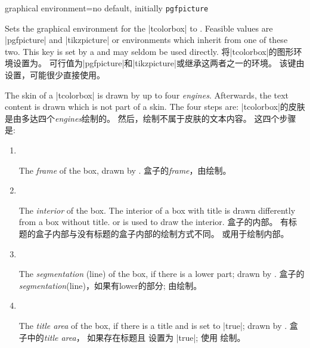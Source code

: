 \begin{docTcbKey}{graphical environment}{=}{no default, initially \texttt{pgfpicture}}
\begin{stripedbox}
Sets the graphical environment for the |tcolorbox| to .
Feasible values are |pgfpicture| and |tikzpicture| or environments which inherit from one of these two. 
This key is set by a  and may seldom be used directly.
\tcblower
将|tcolorbox|的图形环境设置为。%
可行值为|pgfpicture|和|tikzpicture|或继承这两者之一的环境。%
该键由设置，可能很少直接使用。
\end{stripedbox}
\end{docTcbKey}

\begin{stripedbox}
The skin of a |tcolorbox| is drawn by up to four \emph{engines}.
Afterwards, the text content is drawn which is not part of a skin.
The four steps are:
\tcblower
|tcolorbox|的皮肤是由多达四个\emph{engines}绘制的。%
然后，绘制不属于皮肤的文本内容。%
这四个步骤是:
\end{stripedbox}

\begin{enumerate}
\item 
~\vspace*{-1em}
\begin{stripedbox}
The \emph{frame} of the box, drawn by .
\tcblower
盒子的\emph{frame}，由绘制。
\end{stripedbox}

\item 
~\vspace*{-1em}
\begin{stripedbox}
The \emph{interior} of the box. 
The interior of a box with title is   drawn differently from a box without title.
 or    is used to draw the interior.
\tcblower
盒子的内部。
有标题的盒子内部与没有标题的盒子内部的绘制方式不同。
或用于绘制内部。
\end{stripedbox}

\item 
~\vspace*{-1em}
\begin{stripedbox}
The \emph{segmentation} (line) of the box, if there is a lower part;
drawn by .
\tcblower
盒子的\emph{segmentation}(line)，如果有lower的部分;
由绘制。
\end{stripedbox}

\item 
~\vspace*{-1em}
\begin{stripedbox}
The \emph{title area} of the box, if there is a title and
 is set to |true|; drawn
by .
\tcblower
盒子中的\emph{title area}，
如果存在标题且  设置为 |true|; 使用  绘制。  
\end{stripedbox}
\end{enumerate}

